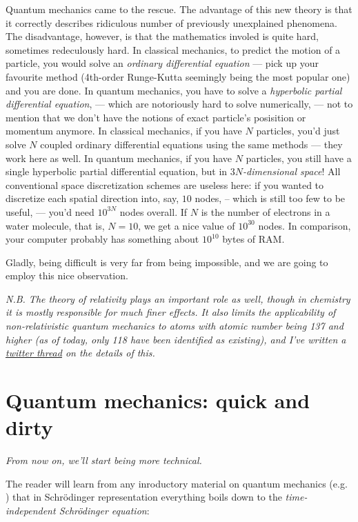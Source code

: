 \documentclass{article}
\begin{document}
Quantum mechanics came to the rescue. The advantage of this new theory is that it correctly describes ridiculous number of previously unexplained phenomena. The disadvantage, however, is that the mathematics involed is quite hard, sometimes redeculously hard. In classical mechanics, to predict the motion of a particle, you would solve an \textit{ordinary differential equation} --- pick up your favourite method (4th-order Runge-Kutta seemingly being the most popular one) and you are done. In quantum mechanics, you have to solve a \textit{hyperbolic partial differential equation}, --- which are notoriously hard to solve numerically, --- not to mention that we don't have the notions of exact particle's posisition or momentum anymore. In classical mechanics, if you have \(N\) particles, you'd just solve \(N\) coupled ordinary differential equations using the same methods --- they work here as well. In quantum mechanics, if you have \(N\) particles, you still have a single hyperbolic partial differential equation, but in \textit{\(3N\)-dimensional space}! All conventional space discretization schemes are useless here: if you wanted to discretize each spatial direction into, say, \(10\) nodes, -- which is still too few to be useful, --- you'd need \(10^{3N}\) nodes overall. If \(N\) is the number of electrons in a water molecule, that is, \(N=10\), we get a nice value of \(10^{30}\) nodes. In comparison, your computer probably has something about \(10^10\) bytes of RAM.

Gladly, being difficult is very far from being impossible, and we are going to employ this nice observation.

\textit{N.B. The theory of relativity plays an important role as well, though in chemistry it is mostly responsible for much finer effects. It also limits the applicability of non-relativistic quantum mechanics to atoms with atomic number being 137 and higher (as of today, only 118 have been identified as existing), and I've written a \href{https://twitter.com/lisyarus/status/1189227697605660673?s=20}{twitter thread} on the details of this.}

\newpage

\section{Quantum mechanics: quick and dirty} \label{sec:qm}

\textit{From now on, we'll start being more technical.}

The reader will learn from any inroductory material on quantum mechanics (e.g. \cite{ref:atkins}) that in Schrödinger representation everything boils down to the \textit{time-independent Schrödinger equation}:
\end{document}

